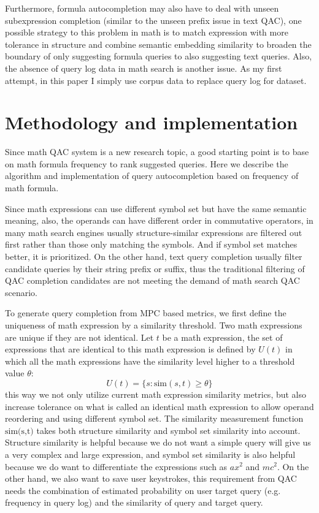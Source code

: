 \documentclass[12pt]{article} %
\begin{document}
Furthermore, formula autocompletion may also have to deal with unseen subexpression completion (similar to the unseen prefix issue in text QAC), one possible strategy to this problem in math is to match  expression with more tolerance in structure and combine semantic embedding similarity to broaden the boundary of only suggesting formula queries to also suggesting text queries.
Also, the absence of query log data in math search is another issue.
As my first attempt, in this paper I simply use corpus data to replace query log for dataset.

\section{Methodology and implementation}
Since math QAC system is a new research topic, a good starting point is to base on math formula frequency to rank suggested queries.
Here we describe the algorithm and implementation of query autocompletion based on frequency of math formula.

Since math expressions can use different symbol set but have the same semantic meaning, also, the operands can have different order in commutative operators,
in many math search engines usually structure-similar expressions are filtered out first rather than those only matching the symbols.
And if symbol set matches better, it is prioritized.
On the other hand, text query completion usually filter candidate queries by their string prefix or suffix, thus the traditional filtering of QAC completion candidates are not meeting the demand of math search QAC scenario.

To generate query completion from MPC based metrics, we first define the uniqueness of math expression by a similarity threshold.
Two math expressions are unique if they are not identical.
Let $t$ be a math expression, the set of expressions that are identical to this math expression is defined by $U(t)$ in which all the math expressions have the similarity level higher to a threshold value $\theta$:
$$
U(t) = \{s: \text{sim}(s, t) \ge \theta\}
$$
this way we not only utilize current math expression similarity metrics,
but also increase tolerance on what is called an identical math expression to allow operand reordering and using different symbol set.
The similarity measurement function $\text{sim(s,t)}$ takes both structure similarity and symbol set similarity into account.
Structure similarity is helpful because we do not want a simple query will give us a very complex and large expression, and symbol set similarity is also helpful because we do want to differentiate the expressions such as $ax^2$ and $mc^2$.
On the other hand, we also want to save user keystrokes, this requirement from QAC needs the combination of estimated probability on user target query (e.g. frequency in query log) and the similarity of query and target query.
\end{document}

